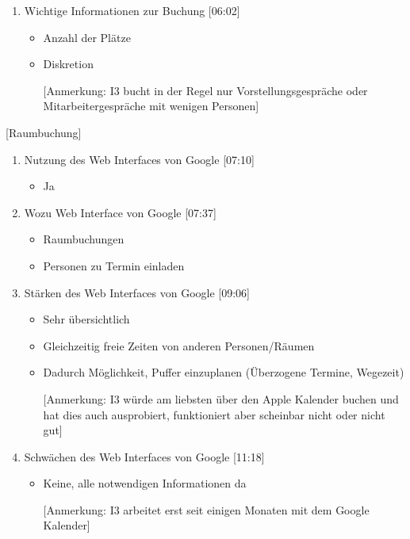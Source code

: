 \begin{enumerate}
    \item Wichtige Informationen zur Buchung [06:02]
     \begin{itemize}
        \item Anzahl der Plätze
        \item Diskretion
        \item[] [Anmerkung: I3 bucht in der Regel nur Vorstellungsgespräche oder Mitarbeitergespräche mit wenigen Personen]
    \end{itemize}

\end{enumerate}

[Raumbuchung]

\begin{enumerate}

    \item Nutzung des Web Interfaces von Google [07:10]
     \begin{itemize}
        \item Ja
    \end{itemize}
    
    \item Wozu Web Interface von Google [07:37]
     \begin{itemize}
        \item Raumbuchungen
        \item Personen zu Termin einladen
    \end{itemize}
    
    \item Stärken des Web Interfaces von Google [09:06]
     \begin{itemize}
        \item Sehr übersichtlich
        \item Gleichzeitig freie Zeiten von anderen Personen/Räumen
        \item Dadurch Möglichkeit, Puffer einzuplanen (Überzogene Termine, Wegezeit)
        \item[] [Anmerkung: I3 würde am liebsten über den Apple Kalender buchen und hat dies auch ausprobiert, funktioniert aber scheinbar nicht oder nicht gut]
    \end{itemize}
    
    \item Schwächen des Web Interfaces von Google [11:18]
     \begin{itemize}
        \item Keine, alle notwendigen Informationen da
        \item[] [Anmerkung: I3 arbeitet erst seit einigen Monaten mit dem Google Kalender]
    \end{itemize}
    

\end{enumerate}
